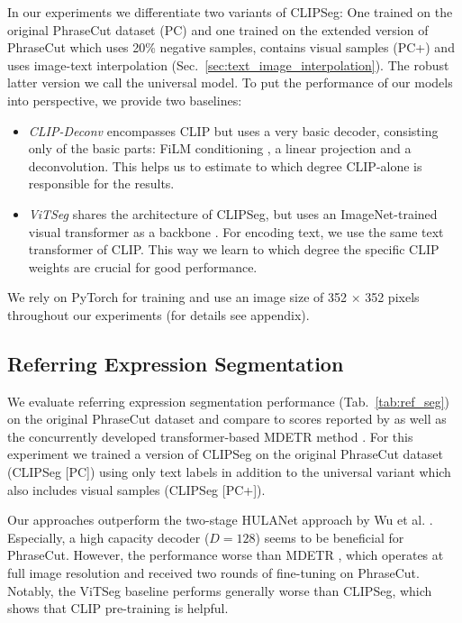 In our experiments we differentiate two variants of CLIPSeg: One trained on the original PhraseCut dataset (PC) and one trained on the extended version of PhraseCut which uses 20\% negative samples, contains visual samples (PC+) and uses image-text interpolation (Sec.~\ref{sec:text_image_interpolation}). The robust latter version we call the universal model. To put the performance of our models into perspective, we provide two baselines:
\begin{itemize}
\setlength\itemsep{0em}
    \item \emph{CLIP-Deconv} encompasses CLIP but uses a very basic decoder, consisting only of the basic parts: FiLM conditioning \cite{dumoulin18}, a linear projection and a deconvolution. This helps us to estimate to which degree CLIP-alone is responsible for the results.
    \item \emph{ViTSeg} shares the architecture of CLIPSeg, but uses an ImageNet-trained visual transformer as a backbone \cite{timm}. For encoding text, we use the same text transformer of CLIP. This way we learn to which degree the specific CLIP weights are crucial for good performance.
\end{itemize}
We rely on PyTorch \cite{pytorch} for training and use an image size of 352 $\times$ 352 pixels throughout our experiments (for details see appendix).

\subsection{Referring Expression Segmentation}
We evaluate referring expression segmentation performance (Tab.~\ref{tab:ref_seg}) on the original PhraseCut dataset and compare to scores reported by \citet{wu20phrasecut} as well as the concurrently developed transformer-based MDETR method \cite{kamath21}. 
For this experiment we trained a version of CLIPSeg on the original PhraseCut dataset (CLIPSeg [PC]) using only text labels in addition to the universal variant which also includes visual samples (CLIPSeg [PC+]).

Our approaches outperform the two-stage HULANet approach by Wu et al. \cite{wu20phrasecut}. Especially, a high capacity decoder ($D=128$) seems to be beneficial for PhraseCut. However, the performance worse than MDETR \cite{kamath21}, which operates at full image resolution and received two rounds of fine-tuning on PhraseCut. 
Notably, the ViTSeg baseline performs generally worse than CLIPSeg, which shows that CLIP pre-training is helpful.

